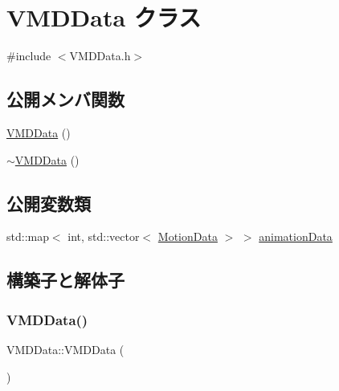 \hypertarget{class_v_m_d_data}{}\section{V\+M\+D\+Data クラス}
\label{class_v_m_d_data}


{\ttfamily \#include $<$V\+M\+D\+Data.\+h$>$}

\subsection*{公開メンバ関数}
\begin{DoxyCompactItemize}
\item 
\mbox{\hyperlink{class_v_m_d_data_a1e2180f6a1647d71762e06c20610c7cc}{V\+M\+D\+Data}} ()
\item 
\mbox{\hyperlink{class_v_m_d_data_a53b44a3fb1b37c71c54b16f42f297279}{$\sim$\+V\+M\+D\+Data}} ()
\end{DoxyCompactItemize}
\subsection*{公開変数類}
\begin{DoxyCompactItemize}
\item 
std\+::map$<$ int, std\+::vector$<$ \mbox{\hyperlink{struct_motion_data}{Motion\+Data}} $>$ $>$ \mbox{\hyperlink{class_v_m_d_data_a539318f7e05cc1af1dd3ca83613494a4}{animation\+Data}}
\end{DoxyCompactItemize}


\subsection{構築子と解体子}
\mbox{\label{class_v_m_d_data_a1e2180f6a1647d71762e06c20610c7cc}} 
\subsubsection{\texorpdfstring{V\+M\+D\+Data()}{VMDData()}}
{\footnotesize\ttfamily V\+M\+D\+Data\+::\+V\+M\+D\+Data (\begin{DoxyParamCaption}{ }\end{DoxyParamCaption})}

\mbox{\label{class_v_m_d_data_a53b44a3fb1b37c71c54b16f42f297279}} 
